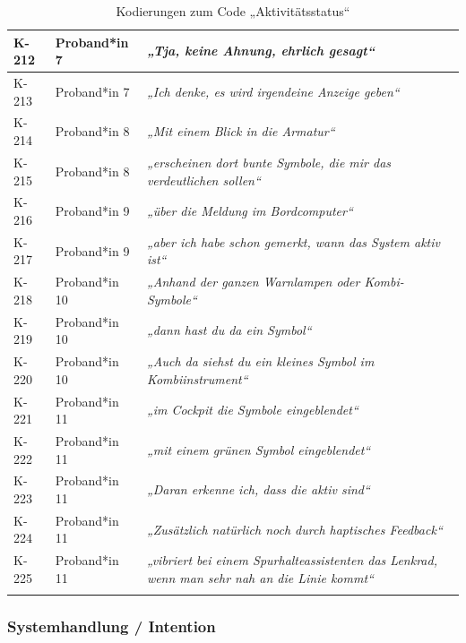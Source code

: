 {\begin{xltabular}{\textwidth}{
    |P{0.10\textwidth}
    |P{0.17\textwidth}
    |Y|
}
\hline
K-212 & Proband*in 7 & \textit{„Tja, keine Ahnung, ehrlich gesagt“} \\
\hline
K-213 & Proband*in 7 & \textit{„Ich denke, es wird irgendeine Anzeige geben“} \\
\hline
K-214 & Proband*in 8 & \textit{„Mit einem Blick in die Armatur“} \\
\hline
K-215 & Proband*in 8 & \textit{„erscheinen dort bunte Symbole, die mir das verdeutlichen sollen“} \\
\hline
K-216 & Proband*in 9 & \textit{„über die Meldung im Bordcomputer“} \\
\hline
K-217 & Proband*in 9 & \textit{„aber ich habe schon gemerkt, wann das System aktiv ist“} \\
\hline
K-218 & Proband*in 10 & \textit{„Anhand der ganzen Warnlampen oder Kombi-Symbole“} \\
\hline
K-219 & Proband*in 10 & \textit{„dann hast du da ein Symbol“} \\
\hline
K-220 & Proband*in 10 & \textit{„Auch da siehst du ein kleines Symbol im Kombiinstrument“} \\
\hline
K-221 & Proband*in 11 & \textit{„im Cockpit die Symbole eingeblendet“} \\
\hline
K-222 & Proband*in 11 & \textit{„mit einem grünen Symbol eingeblendet“} \\
\hline
K-223 & Proband*in 11 & \textit{„Daran erkenne ich, dass die aktiv sind“} \\
\hline
K-224 & Proband*in 11 & \textit{„Zusätzlich natürlich noch durch haptisches Feedback“} \\
\hline
K-225 & Proband*in 11 & \textit{„vibriert bei einem Spurhalteassistenten das Lenkrad, wenn man sehr nah an die Linie kommt“} \\
\hline
\caption{Kodierungen zum Code „Aktivitätsstatus“}\label{tab:kodiernachweis-aktivitaetsstatus}\\
\end{xltabular}
}

\clearpage
\subsubsection{Systemhandlung / Intention}

